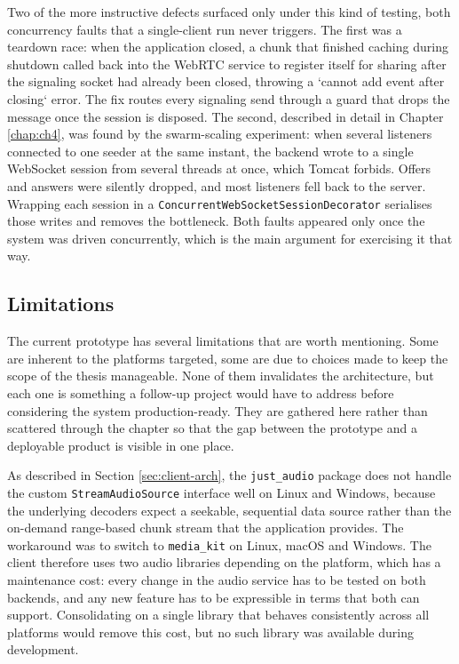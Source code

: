 \par Two of the more instructive defects surfaced only under this kind of testing, both concurrency faults that a single-client run never triggers. The first was a teardown race: when the application closed, a chunk that finished caching during shutdown called back into the WebRTC service to register itself for sharing after the signaling socket had already been closed, throwing a `cannot add event after closing` error. The fix routes every signaling send through a guard that drops the message once the session is disposed. The second, described in detail in Chapter \ref{chap:ch4}, was found by the swarm-scaling experiment: when several listeners connected to one seeder at the same instant, the backend wrote to a single WebSocket session from several threads at once, which Tomcat forbids. Offers and answers were silently dropped, and most listeners fell back to the server. Wrapping each session in a \texttt{ConcurrentWebSocketSessionDecorator} serialises those writes and removes the bottleneck. Both faults appeared only once the system was driven concurrently, which is the main argument for exercising it that way.

\subsection{Limitations}
\label{sec:limitations}

\indent \par The current prototype has several limitations that are worth mentioning. Some are inherent to the platforms targeted, some are due to choices made to keep the scope of the thesis manageable. None of them invalidates the architecture, but each one is something a follow-up project would have to address before considering the system production-ready. They are gathered here rather than scattered through the chapter so that the gap between the prototype and a deployable product is visible in one place.

\indent \par As described in Section \ref{sec:client-arch}, the \texttt{just\_audio} package does not handle the custom \texttt{StreamAudioSource} interface well on Linux and Windows, because the underlying decoders expect a seekable, sequential data source rather than the on-demand range-based chunk stream that the application provides. The workaround was to switch to \texttt{media\_kit} on Linux, macOS and Windows. The client therefore uses two audio libraries depending on the platform, which has a maintenance cost: every change in the audio service has to be tested on both backends, and any new feature has to be expressible in terms that both can support. Consolidating on a single library that behaves consistently across all platforms would remove this cost, but no such library was available during development.

